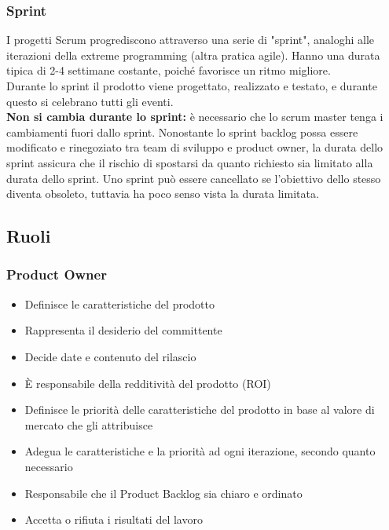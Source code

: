 \documentclass[10pt, a4paper]{article}
\begin{document}
\subsubsection*{Sprint}
I progetti Scrum progrediscono attraverso una serie di "sprint", analoghi alle iterazioni della extreme programming (altra pratica agile). Hanno una durata tipica di 2-4 settimane costante, poiché favorisce un ritmo migliore.\\
Durante lo sprint il prodotto viene progettato, realizzato e testato, e durante questo si celebrano tutti gli eventi.\\
\textbf{Non si cambia durante lo sprint:} è necessario che lo scrum master tenga i cambiamenti fuori dallo sprint. Nonostante lo sprint backlog possa essere modificato e rinegoziato tra team di sviluppo e product owner, la durata dello sprint assicura che il rischio di spostarsi da quanto richiesto sia limitato alla durata dello sprint. Uno sprint può essere cancellato se l'obiettivo dello stesso diventa obsoleto, tuttavia ha poco senso vista la durata limitata.

\subsection{Ruoli}
\subsubsection*{Product Owner}
\begin{itemize}
	\item Definisce le caratteristiche del prodotto
	\item Rappresenta il desiderio del committente
	\item Decide date e contenuto del rilascio
	\item È responsabile della redditività del prodotto (ROI)
	\item Definisce le priorità delle caratteristiche del prodotto in base al valore di mercato che gli attribuisce
	\item Adegua le caratteristiche e la priorità ad ogni iterazione, secondo quanto necessario
	\item Responsabile che il Product Backlog sia chiaro e ordinato
	\item Accetta o rifiuta i risultati del lavoro
\end{itemize}
\end{document}
